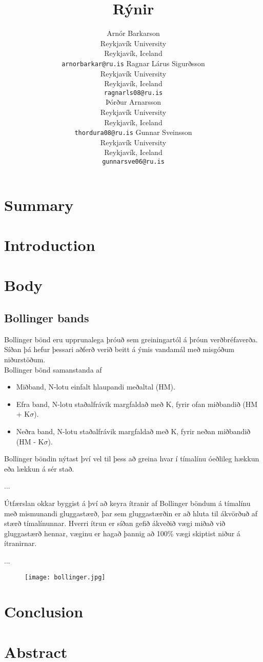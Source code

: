 \documentclass[11pt]{article}
\title{Rýnir}
\author{Arnór Barkarson\\
  Reykjavík University\\
  Reykjavík, Iceland\\
  {\tt arnorbarkar@ru.is}  \And  
  Ragnar Lárus Sigurðsson\\
  Reykjavík University\\
  Reykjavík, Iceland\\
  {\tt  ragnarls08@ru.is}\\ \And 
  Þórður Arnarsson\\
  Reykjavík University\\
  Reykjavík, Iceland\\
  {\tt  thordura08@ru.is}  \And 
  Gunnar Sveinsson\\
  Reykjavík University\\
  Reykjavík, Iceland\\
  {\tt  gunnarsve06@ru.is} 
}
\date{}
\begin{document}
\maketitle


\section{Summary}
\section{Introduction}
\section{Body}

\subsection{Bollinger bands}
\label{sec:third}

Bollinger bönd eru upprunalega þróuð sem greiningartól á þróun verðbréfaverða. Síðan þá hefur þessari aðferð verið beitt á ýmis
vandamál með misgóðum niðurstöðum. \\

Bollinger bönd samanstanda af
\begin{itemize}
  \item Miðband, N-lotu einfalt hlaupandi meðaltal (HM).
  \item Efra band, N-lotu staðalfrávik margfaldað með K, fyrir ofan miðbandið (HM + K$\sigma$).
  \item Neðra band, N-lotu staðalfrávik margfaldað með K, fyrir neðan miðbandið (HM - K$\sigma$).
\end{itemize}

Bollinger böndin nýtast því vel til þess að greina hvar í tímalínu óeðlileg hækkun eða lækkun á sér stað.



...

Útfærslan okkar byggist á því að keyra ítranir af Bollinger böndum á tímalínu með mismunandi gluggastærð, þar sem gluggastærðin er að hluta til ákvörðuð
af stærð tímalínunnar. Hverri ítrun er síðan gefið ákveðið vægi miðað við gluggastærð hennar, væginu er hagað þannig að 100\% vægi skiptist niður á ítranirnar.

...

\begin{figure}
  \texttt{[image: bollinger.jpg]}
\end{figure}




\section{Conclusion}
\section{Abstract}

 
\end{document}
